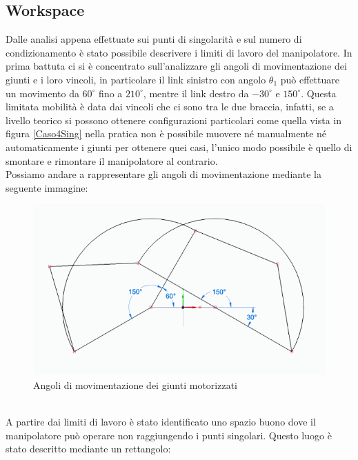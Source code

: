 \subsection{Workspace}
Dalle analisi appena effettuate sui punti di singolarità e sul numero di condizionamento è stato possibile descrivere i limiti di lavoro del manipolatore. In prima battuta ci si è concentrato sull'analizzare gli angoli di movimentazione dei giunti e i loro vincoli, in particolare il link sinistro con angolo $\theta_1$ può effettuare un movimento da $60^\circ$ fino a $210^\circ$, mentre il link destro da $-30^\circ$ e $150^\circ$. Questa limitata mobilità è data dai vincoli che ci sono tra le due braccia, infatti, se a livello teorico si possono ottenere configurazioni particolari come quella vista in figura \ref{Caso4Sing} nella pratica non è possibile muovere né manualmente né automaticamente i giunti per ottenere quei casi, l'unico modo possibile è quello di smontare e rimontare il manipolatore al contrario. \\Possiamo andare a rappresentare gli angoli di movimentazione mediante la seguente immagine: 
\begin{figure}[ht]
	\begin{center}
		\includegraphics[scale=0.7]{Immagini/Singolarity/workangle}
		\caption{Angoli di movimentazione dei giunti motorizzati}
	\end{center}
\end{figure}
\\A partire dai limiti di lavoro è stato identificato uno spazio buono dove il manipolatore può operare non raggiungendo i punti singolari. Questo luogo è stato descritto mediante un rettangolo:
